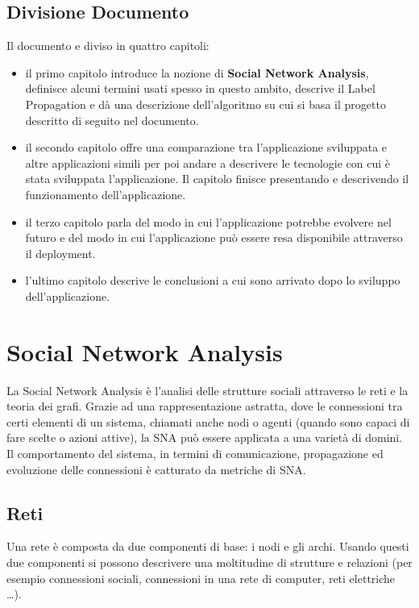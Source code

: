 \documentclass[a4paper,12pt]{report}
\begin{document}
\section{Divisione Documento}
Il documento e diviso in quattro capitoli:
\begin{itemize}
\item il primo capitolo introduce la nozione di \textbf{Social Network Analysis}, definisce alcuni termini usati spesso in questo ambito, descrive il Label Propagation e dà una descrizione dell'algoritmo su cui si basa il progetto descritto di seguito nel documento.

\item il secondo capitolo offre una comparazione tra l'applicazione sviluppata e altre applicazioni simili per poi andare a descrivere le tecnologie con cui è stata sviluppata l'applicazione. Il capitolo finisce presentando e descrivendo il funzionamento dell'applicazione.

\item il terzo capitolo parla del modo in cui l'applicazione potrebbe evolvere nel futuro e del modo in cui l'applicazione può essere resa disponibile attraverso il deployment.

\item l'ultimo capitolo descrive le conclusioni a cui sono arrivato dopo lo sviluppo dell'applicazione.

\end{itemize}
%

\chapter{Social Network Analysis}
	La Social Network Analysis è l'analisi delle strutture sociali attraverso le reti e la teoria dei grafi. \cite{snaintro}
	Grazie ad una rappresentazione astratta, dove le connessioni tra certi elementi di un sistema, chiamati anche nodi o agenti (quando sono capaci di fare scelte o azioni attive), la SNA può essere applicata a una varietà di domini. Il comportamento del sistema, in termini di comunicazione, propagazione ed evoluzione delle connessioni è catturato da metriche di SNA. \cite{avpra}

	\section{Reti}
	Una rete è composta da due componenti di base: i nodi e gli archi. Usando questi due componenti si possono descrivere una moltitudine di strutture e relazioni (per esempio connessioni sociali, connessioni in una rete di computer, reti elettriche \dots). 
\end{document}
